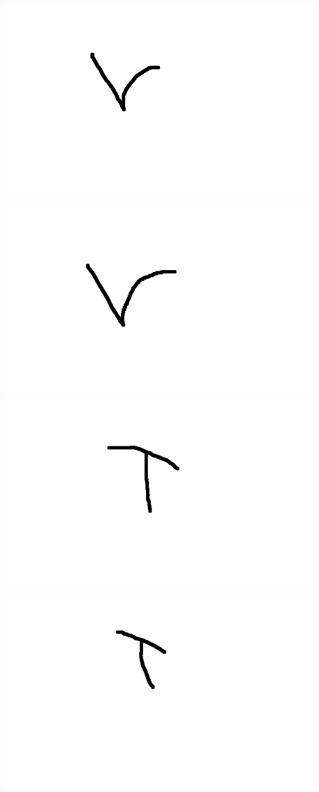 \documentclass[a4paper,12px,twocolumn]{article}
\begin{document}
\begin{flushleft}
        \includegraphics[scale=0.1]{tv12}
        \includegraphics[scale=0.1]{tv13}
        \includegraphics[scale=0.1]{tT11}
        \includegraphics[scale=0.1]{tT13}

\end{flushleft}
\end{document}
